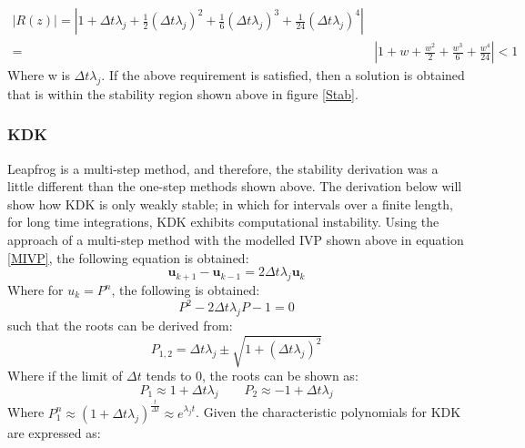 \documentclass[conf]{new-aiaa}
\begin{document}
     \begin{equation}
     \begin{aligned}
         |R(z)| =\left |1 + \Delta t \lambda_j + \frac{1}{2}(\Delta t \lambda_j)^2 + \frac{1}{6}(\Delta t \lambda_j)^3 + \frac{1}{24}(\Delta t \lambda_j)^4 \right|
         \\
         =&\left |1 + w + \frac{w^2}{2} + \frac{w^3}{6} + \frac{w^4}{24}\right| < 1
     \end{aligned}
     \end{equation}
     Where w is $\Delta t \lambda_j$. If the above requirement is satisfied, then a solution is obtained that is within the stability region shown above in figure \ref{Stab}.
        
        \subsubsection{KDK}
         Leapfrog is a multi-step method, and therefore, the stability derivation was a little different than the one-step methods shown above. The derivation below will show how KDK is only weakly stable; in which for intervals over a finite length, for long time integrations, KDK exhibits computational instability\cite{LeapFTI}. Using the approach of a multi-step method with the modelled IVP shown above in equation \eqref{MIVP}, the following equation is obtained\cite{NumSol}:
         \begin{equation}
             \bm{u}_{k+1} - \bm{u}_{k-1} = 2\Delta t \lambda_j \bm{u}_k
         \end{equation}
         Where for $u_k = P^n$, the following is obtained:
         \begin{equation}
             P^2 - 2\Delta t \lambda_j P - 1 = 0
         \end{equation}
         such that the roots can be derived from:
         \begin{equation}
             P_{1,2} = \Delta t \lambda_j \pm \sqrt{1 + (\Delta t \lambda_j)^2}
         \end{equation}
         Where if the limit of $\Delta t$ tends to 0, the roots can be shown as:
         \begin{equation*}
             P_1 \approx 1 + \Delta t \lambda_j \qquad P_2 \approx -1 + \Delta t \lambda_j 
         \end{equation*}
         Where $P^{n}_{1} \approx (1 + \Delta t \lambda_j)^{\frac{t}{\Delta t}} \approx e^{\lambda_j t}$. Given the characteristic polynomials for KDK are expressed as\cite{ABS}:
\end{document}
